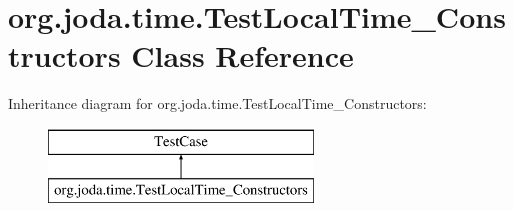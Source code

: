 \hypertarget{classorg_1_1joda_1_1time_1_1_test_local_time___constructors}{\section{org.\-joda.\-time.\-Test\-Local\-Time\-\_\-\-Constructors Class Reference}
\label{classorg_1_1joda_1_1time_1_1_test_local_time___constructors}
}
Inheritance diagram for org.\-joda.\-time.\-Test\-Local\-Time\-\_\-\-Constructors\-:\begin{figure}[H]
\begin{center}
\leavevmode
\includegraphics[height=2.000000cm]{classorg_1_1joda_1_1time_1_1_test_local_time___constructors}
\end{center}
\end{figure}
